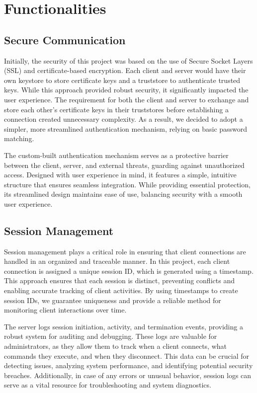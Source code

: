 \documentclass[12pt,a4paper]{report}
\begin{document}
\chapter{Functionalities}
\section{Secure Communication}
Initially, the security of this project was based on the use of Secure Socket Layers (SSL) and certificate-based encryption. Each client and server would have their own keystore to store certificate keys and a truststore to authenticate trusted keys. While this approach provided robust security, it significantly impacted the user experience. The requirement for both the client and server to exchange and store each other's certificate keys in their truststores before establishing a connection created unnecessary complexity. As a result, we decided to adopt a simpler, more streamlined authentication mechanism, relying on basic password matching.

The custom-built authentication mechanism serves as a protective barrier between the client, server, and external threats, guarding against unauthorized access. Designed with user experience in mind, it features a simple, intuitive structure that ensures seamless integration. While providing essential protection, its streamlined design maintains ease of use, balancing security with a smooth user experience.

\section{Session Management}
Session management plays a critical role in ensuring that client connections are handled in an organized and traceable manner. In this project, each client connection is assigned a unique session ID, which is generated using a timestamp. This approach ensures that each session is distinct, preventing conflicts and enabling accurate tracking of client activities. By using timestamps to create session IDs, we guarantee uniqueness and provide a reliable method for monitoring client interactions over time.

The server logs session initiation, activity, and termination events, providing a robust system for auditing and debugging. These logs are valuable for administrators, as they allow them to track when a client connects, what commands they execute, and when they disconnect. This data can be crucial for detecting issues, analyzing system performance, and identifying potential security breaches. Additionally, in case of any errors or unusual behavior, session logs can serve as a vital resource for troubleshooting and system diagnostics.
\end{document}
